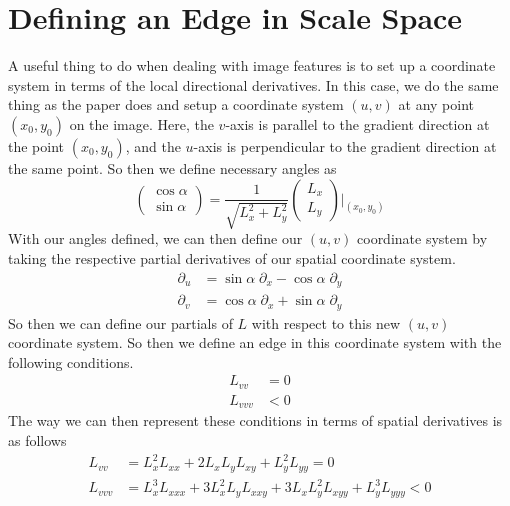 \documentclass{article}
\begin{document}
\section{Defining an Edge in Scale Space}
A useful thing to do when dealing with image features is to set up a coordinate system in terms of the local directional derivatives.
In this case, we do the same thing as the paper does and setup a coordinate system $(u,v)$ at any point $(x_0,y_0)$ on the image.
Here, the $v$-axis is parallel to the gradient direction at the point $(x_0, y_0)$, and the $u$-axis is perpendicular to the gradient direction at the same point. So then we define necessary angles as
\begin{equation}
  \begin{pmatrix}
    \cos{\alpha} \\
    \sin{\alpha}
  \end{pmatrix}
  = \frac{1}{\sqrt{L_x^2+L_y^2}}
  \begin{pmatrix}
    L_x \\
    L_y
  \end{pmatrix}
  \Bigg|_{(x_0,y_0)}
\end{equation}
With our angles defined, we can then define our $(u,v)$ coordinate system by taking the respective partial derivatives of our spatial coordinate system.
\begin{align}
  \partial_u &= \sin{\alpha}\; \partial_x - \cos{\alpha}\; \partial_y \\
  \partial_v &= \cos{\alpha}\; \partial_x + \sin{\alpha}\; \partial_y
\end{align}
So then we can define our partials of $L$ with respect to this new $(u,v)$ coordinate system. So then we define an edge in this coordinate system with the following conditions.
\begin{equation} \label{eq:c1}
  \begin{aligned}
    L_{vv} &= 0 \\
    L_{vvv} &< 0
  \end{aligned}
\end{equation}
The way we can then represent these conditions in terms of spatial derivatives is as follows
\begin{equation}
  \begin{aligned}
    L_{vv} &= L_x^2L_{xx}+2L_xL_yL_{xy}+L_y^2L_{yy} = 0 \\
    L_{vvv} &= L_x^3L_{xxx} +3L_x^2L_yL_{xxy}+3L_xL_y^2L_{xyy}+L_y^3L_{yyy} < 0
  \end{aligned}
\end{equation}
\end{document}
